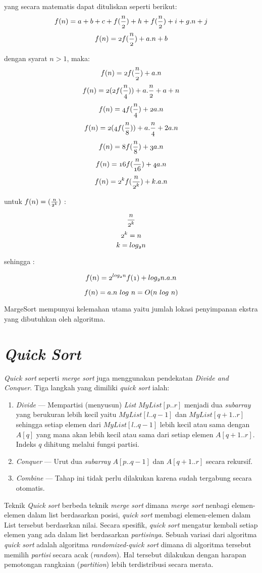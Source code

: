 \documentclass[12pt]{book}%
\begin{document}
yang secara matematis dapat dituliskan seperti berikut:
$$	  \mathnormal{f(n) = a+b+c+f(\frac{n}{2})+h+f(\frac{n}{2})+i+g.n+j } $$
$$	  \mathnormal{f(n) = 2f(\frac{n}{2})+a.n + b} $$

dengan syarat $n > 1$, maka:
$$	  \mathnormal{f(n) = 2f(\frac{n}{2})+a.n } $$
$$	  \mathnormal{f(n) = 2(2f(\frac{n}{4}))+a.\frac{n}{2} } + a+n $$
$$	  \mathnormal{f(n) = 4f(\frac{n}{4})+2a.n } $$
$$	  \mathnormal{f(n) = 2(4f(\frac{n}{8}))+a.\frac{n}{4} }+2a.n $$
$$	  \mathnormal{f(n) = 8f(\frac{n}{8})+3a.n } $$
$$	  \mathnormal{f(n) = 16f(\frac{n}{16})+4a.n } $$
$$	  \mathnormal{f(n) = 2^{k}f(\frac{n}{2^{k}})+k.a.n } $$

untuk $ \mathnormal{f(n) = (\frac{n}{2^{k}})} $ :

$$ \mathnormal{\frac{n}{2^{k}}} $$
$$ \mathnormal{2^{k}=n} $$
$$ \mathnormal{k=log_{2}n} $$

sehingga :

$$	  \mathnormal{f(n) = 2^{log_{2}n}f(1)+log_{2}n.a.n } $$

$$	  \mathnormal{f(n) = a.n\ log\ n = O(n\ log\ n)} $$

MargeSort mempunyai kelemahan utama yaitu jumlah lokasi penyimpanan ekstra yang dibutuhkan oleh algoritma.
 
\section{\textit{Quick Sort}}

\textit{Quick sort} seperti \textit{merge sort} juga menggunakan pendekatan \textit{Divide and Conquer}. Tiga langkah yang dimiliki \textit{quick sort} ialah:
\begin{enumerate}
	\item \textit{Divide} --- Mempartisi (menyusun) \textit{List} $MyList[p..r]$ menjadi dua \textit{subarray} yang berukuran lebih kecil yaitu $MyList[l..q-1]$ dan $MyList[q+1..r]$ sehingga setiap elemen dari $MyList[l..q-1]$ lebih kecil atau sama dengan $A[q]$ yang mana akan lebih kecil atau sama dari setiap elemen $A[q+1..r]$. Indeks $q$ dihitung melalui fungsi partisi.
	\item \textit{Conquer} --- Urut dua \textit{subarray} $A[p..q-1]$ dan $A[q+1..r]$ secara rekursif.
	\item \textit{Combine} --- Tahap ini tidak perlu dilakukan karena sudah tergabung secara otomatis.
\end{enumerate}

Teknik \textit{Quick sort} berbeda teknik \textit{merge sort} dimana \textit{merge sort} nenbagi elemen-elemen dalam list berdasarkan posisi, \textit{quick sort} membagi elemen-elemen dalam List tersebut berdasrkan nilai. Secara spesifik, \textit{quick sort} mengatur kembali setiap elemen yang ada dalam list berdasarkan \emph{partisinya}. Sebuah variasi dari algoritma \textit{quick sort} adalah algoritma \textit{randomized-quick sort} dimana di algoritma tersebut memilih \textit{partisi} secara acak (\textit{random}). Hal tersebut dilakukan dengan harapan pemotongan rangkaian (\textit{partition}) lebih terdistribusi secara merata.
\end{document}
